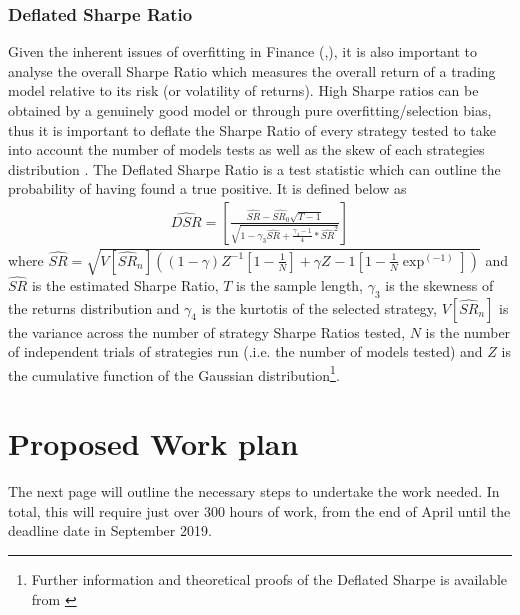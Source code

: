 \documentclass[11pt, a4paper]{article}
\begin{document}
\subsubsection{Deflated Sharpe Ratio}
Given the inherent issues of overfitting in Finance (\cite{Arnott2018},\cite{LopezdePrado2018}), it is also important to analyse the overall Sharpe Ratio \cite{Sharpe2009} which measures the overall return of a trading model relative to its risk (or volatility of returns). \newline High Sharpe ratios can be obtained by a genuinely good model or through pure overfitting/selection bias, thus it is important to deflate the Sharpe Ratio of every strategy tested to take into account the number of models tests as well as the skew of each strategies distribution \cite{Bailey2014}. 
The Deflated Sharpe Ratio is a test statistic which can outline the probability of having found a true positive. It is defined below as
\begin{align}
\widehat{DSR} = \left[
		 				\frac{\widehat{SR}-\widehat{SR_{0}}\sqrt{T-1}}
						{\sqrt{1-\gamma_{3}\widehat{SR} + \frac{\gamma_{4} - 1}{4}*\widehat{SR}^{2}}} 
				 \right]
\end{align}
where $\widehat{SR} = \sqrt{V\left[\widehat{SR}_{n}\right] 
						\left(      	
							\left(1- \gamma\right) Z^{-1} \left[ 1- \frac{1}{N}\right] + \gamma Z^{}-1 \left[ 1-\frac{1}{N}\exp^(-1) \right] 
						 \right)}$
and $\widehat{SR}$ is the estimated Sharpe Ratio, $T$ is the sample length, $\gamma_{3}$ is the skewness of the returns distribution and $\gamma_{4}$ is the kurtotis of the selected strategy,  $V\left[\widehat{SR}_{n}\right]$ is the variance across the number of strategy Sharpe Ratios tested, $N$ is the number of independent trials of strategies run (.i.e. the number of models tested) and $Z$ is the cumulative function of the Gaussian distribution\footnote{Further information and theoretical proofs of the Deflated Sharpe is available from \cite{Bailey2014}}.  

\section{Proposed Work plan}
The next page will outline the necessary steps to undertake the work needed. In total, this will require just over 300 hours of work, from the end of April until the deadline date in September 2019.
\end{document}
